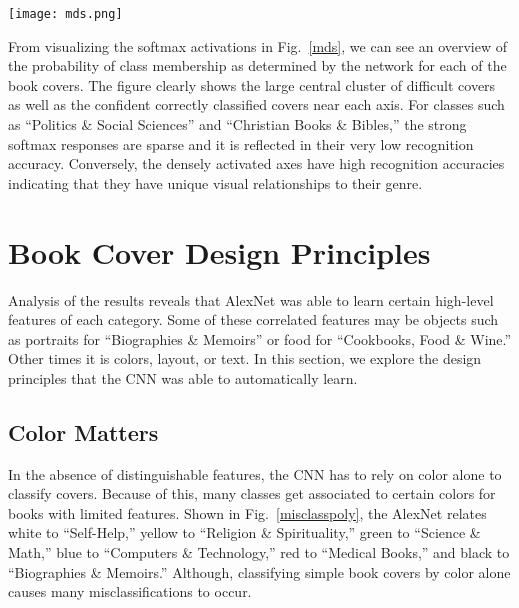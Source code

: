 \documentclass[conference]{IEEEtran}
\begin{document}
\begin{figure*}[tb]
\begin{center}
\texttt{[image: mds.png]} 
\end{center}
\caption{\label{mds} Visualization of the output layer softmax activations of AlexNet. Each point is a 30-dimensional vector where each dimension is the probability of each output class. For visualization purposes, the points are mapped into 2-dimensional subspace with PCA. The arrows represent the axes of each class. The class ground truth is represented by colors, chosen at random. Sample images with high activations from each class are enlarged.}
\end{figure*}

From visualizing the softmax activations in Fig.~\ref{mds}, we can see an overview of the probability of class membership as determined by the network for each of the book covers.
The figure clearly shows the large central cluster of difficult covers as well as the confident correctly classified covers near each axis.
For classes such as ``Politics \& Social Sciences'' and ``Christian Books \& Bibles,'' the strong softmax responses are sparse and it is reflected in their very low recognition accuracy.
Conversely, the densely activated axes have high recognition accuracies indicating that they have unique visual relationships to their genre.

\section{Book Cover Design Principles}
\label{design}

Analysis of the results reveals that AlexNet was able to learn certain high-level features of each category. 
Some of these correlated features may be objects such as portraits for ``Biographies \& Memoirs'' or food for ``Cookbooks, Food \& Wine.''
Other times it is colors, layout, or text.
In this section, we explore the design principles that the CNN was able to automatically learn. 

\subsection{Color Matters}

In the absence of distinguishable features, the CNN has to rely on color alone to classify covers.
Because of this, many classes get associated to certain colors for books with limited features. 
Shown in Fig.~\ref{misclasspoly}, the AlexNet relates white to ``Self-Help,'' yellow to ``Religion \& Spirituality,'' green to ``Science \& Math,'' blue to ``Computers \& Technology,'' red to ``Medical Books,'' and black to ``Biographies \& Memoirs.''
Although, classifying simple book covers by color alone causes many misclassifications to occur.
\end{document}
